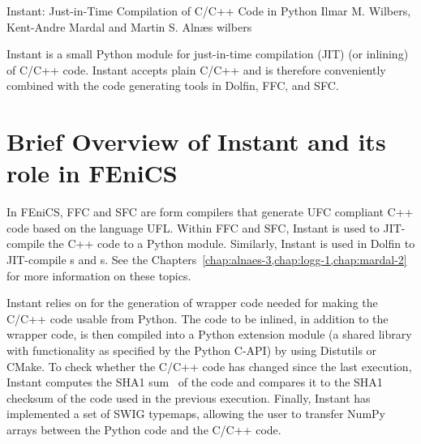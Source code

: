               {Instant: Just-in-Time Compilation of C/C++ Code in Python}
              {Ilmar M. Wilbers, Kent-Andre Mardal and Martin S. Aln{\ae}s}
              {wilbers}


Instant is a small Python module for just-in-time compilation (JIT) (or inlining) of
C/C++ code.
Instant accepts plain C/C++ and is therefore conveniently combined with the code generating tools in Dolfin, FFC, and SFC.   


\section{Brief Overview of Instant and its role in FEniCS}

In FEniCS, FFC and SFC are form compilers that generate UFC compliant C++ code based on the language UFL.  
Within FFC and SFC, Instant is used to JIT-compile the C++ code to a Python module.   
Similarly, Instant is used in Dolfin to JIT-compile s and s. 
See the Chapters~\ref{chap:alnaes-3,chap:logg-1,chap:mardal-2} for more information on these topics. 

Instant relies on \citet{Beazleyothers2009} for the generation of wrapper
code needed for making the C/C++ code usable from
Python.  The code to be inlined, in
addition to the wrapper code, is then compiled into a Python extension
module (a shared library with functionality as specified by the Python
C-API) by using Distutils or CMake. To check whether the C/C++ code has changed
since the last execution, Instant computes the SHA1
sum~\citep{HansenWollman} of the code
and compares it to the SHA1 checksum of the code used in the previous
execution. Finally, Instant has implemented a set of
SWIG typemaps, allowing the user to transfer NumPy
arrays between the Python code and the C/C++ code.


